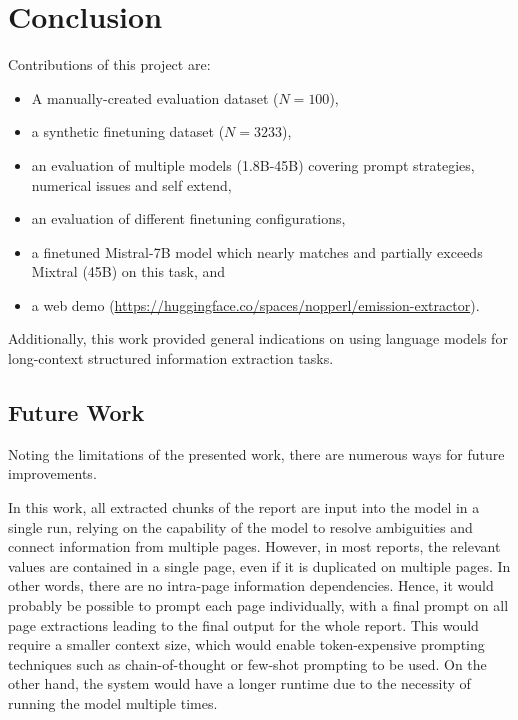\documentclass[]{article}
\begin{document}
\section{Conclusion}
Contributions of this project are:

	\begin{itemize}
	\item A manually-created evaluation dataset ($N=100$),
	\item a synthetic finetuning dataset ($N=3233$),
	\item an evaluation of multiple models (1.8B-45B) covering prompt strategies, numerical issues and self extend,
	\item an evaluation of different finetuning configurations,
	\item a finetuned Mistral-7B model which nearly matches and partially exceeds Mixtral (45B) on this task, and
	\item a web demo (\url{https://huggingface.co/spaces/nopperl/emission-extractor}).
\end{itemize}

Additionally, this work provided general indications on using language models for long-context structured information extraction tasks.

\subsection{Future Work}

Noting the limitations of the presented work, there are numerous ways for future improvements.

In this work, all extracted chunks of the report are input into the model in a single run, relying on the capability of the model to resolve ambiguities and connect information from multiple pages. However, in most reports, the relevant values are contained in a single page, even if it is duplicated on multiple pages. In other words, there are no intra-page information dependencies. Hence, it would probably be possible to prompt each page individually, with a final prompt on all page extractions leading to the final output for the whole report. This would require a smaller context size, which would enable token-expensive prompting techniques such as chain-of-thought \cite{DBLP:conf/nips/Wei0SBIXCLZ22} or few-shot \cite{DBLP:conf/nips/BrownMRSKDNSSAA20} prompting to be used. On the other hand, the system would have a longer runtime due to the necessity of running the model multiple times.
\end{document}
